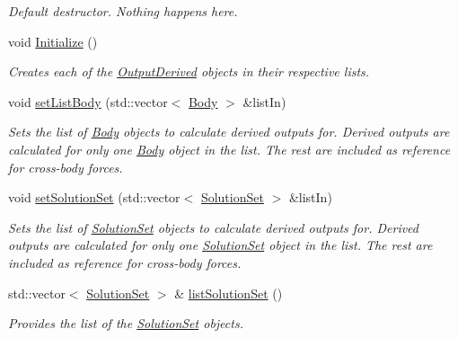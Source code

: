 \begin{DoxyCompactItemize}
\begin{DoxyCompactList}\small\item\em Default destructor. Nothing happens here. \end{DoxyCompactList}\item 
void \hyperlink{classosea_1_1ofreq_1_1_outputs_body_a662db07d35c5f329098a70a838ec868c}{Initialize} ()
\begin{DoxyCompactList}\small\item\em Creates each of the \hyperlink{classosea_1_1ofreq_1_1_output_derived}{Output\-Derived} objects in their respective lists. \end{DoxyCompactList}\item 
void \hyperlink{classosea_1_1ofreq_1_1_outputs_body_affe1a6cc1e310a6b84edec3804340354}{set\-List\-Body} (std\-::vector$<$ \hyperlink{classosea_1_1ofreq_1_1_body}{Body} $>$ \&list\-In)
\begin{DoxyCompactList}\small\item\em Sets the list of \hyperlink{classosea_1_1ofreq_1_1_body}{Body} objects to calculate derived outputs for. Derived outputs are calculated for only one \hyperlink{classosea_1_1ofreq_1_1_body}{Body} object in the list. The rest are included as reference for cross-\/body forces. \end{DoxyCompactList}\item 
void \hyperlink{classosea_1_1ofreq_1_1_outputs_body_a9d77d0704823b360ce4f6e8203203d51}{set\-Solution\-Set} (std\-::vector$<$ \hyperlink{classosea_1_1ofreq_1_1_solution_set}{Solution\-Set} $>$ \&list\-In)
\begin{DoxyCompactList}\small\item\em Sets the list of \hyperlink{classosea_1_1ofreq_1_1_solution_set}{Solution\-Set} objects to calculate derived outputs for. Derived outputs are calculated for only one \hyperlink{classosea_1_1ofreq_1_1_solution_set}{Solution\-Set} object in the list. The rest are included as reference for cross-\/body forces. \end{DoxyCompactList}\item 
std\-::vector$<$ \hyperlink{classosea_1_1ofreq_1_1_solution_set}{Solution\-Set} $>$ \& \hyperlink{classosea_1_1ofreq_1_1_outputs_body_af05d17b2ae5f861198bd56fafa8da3d1}{list\-Solution\-Set} ()
\begin{DoxyCompactList}\small\item\em Provides the list of the \hyperlink{classosea_1_1ofreq_1_1_solution_set}{Solution\-Set} objects. \end{DoxyCompactList}\item 

\end{DoxyCompactItemize}
